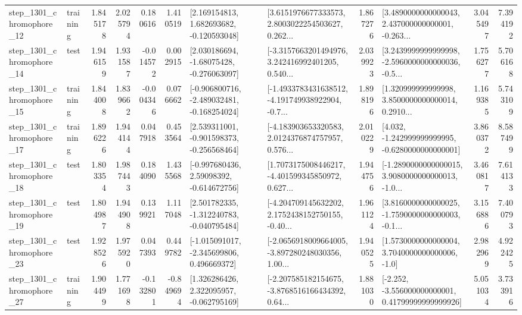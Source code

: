 \begin{tabular}{llrrrrllrlrr}
 step\_1301\_chromophore\_12 &  training &      1.845178 &    2.025794 &      0.180616 &  1.410519 &    [2.169154813, 1.682693682, -0.120593048] &  [3.6151976677333573, 2.8003022254503627, 0.262... &       1.867276 &  [3.4890000000000043, 2.437000000000001, -0.263... &            3.045497 &          7.394192 \\
 step\_1301\_chromophore\_14 &      test &      1.946159 &    1.931587 &     -0.014572 &  0.002915 &    [2.030186694, -1.68075428, -0.276063097] &  [-3.3157663201494976, 3.242416992401205, 0.540... &       2.039923 &  [3.2439999999999998, -2.5960000000000036, -0.5... &            1.756277 &          5.706168 \\
 step\_1301\_chromophore\_15 &  training &      1.844008 &    1.839662 &     -0.004346 &  0.076662 &  [-0.906800716, -2.489032481, -0.168254024] &  [-1.4933783431638512, -4.191749938922904, -0.7... &       1.898196 &  [1.320999999999998, 3.8500000000000014, 0.2910... &            1.169385 &          5.743109 \\
 step\_1301\_chromophore\_17 &  training &      1.896226 &    1.944144 &      0.047918 &  0.453564 &   [2.539311001, -0.901598373, -0.256568464] &  [-4.183903653320583, 2.0124376874757957, 0.576... &       2.010229 &   [4.032, -1.242999999999995, -0.6280000000000001] &            3.860372 &          8.587499 \\
 step\_1301\_chromophore\_18 &      test &      1.803354 &    1.987443 &      0.184090 &  1.435568 &    [-0.997680436, 2.59098392, -0.614672756] &  [1.7073175008446217, -4.401599345850972, 0.627... &       1.944756 &  [-1.2890000000000015, 3.9080000000000013, -1.0... &            3.460817 &          7.614133 \\
 step\_1301\_chromophore\_19 &      test &      1.804987 &    1.944908 &      0.139921 &  1.117048 &   [2.501782335, -1.312240783, -0.040795484] &  [-4.204709145632202, 2.1752438152750155, -0.40... &       1.961124 &  [3.8160000000000025, -1.7590000000000003, -0.1... &            3.156886 &          7.400793 \\
 step\_1301\_chromophore\_23 &      test &      1.928526 &    1.975920 &      0.047393 &  0.449782 &   [-1.015091017, -2.345699806, 0.496669372] &  [-2.0656918009664005, -3.897280248030356, 1.00... &       1.940525 &     [1.5730000000000004, 3.7040000000000006, -1.0] &            2.982969 &          4.922425 \\
 step\_1301\_chromophore\_27 &  training &      1.904499 &    1.771698 &     -0.132801 & -0.849694 &    [1.326286426, 2.322095957, -0.062795169] &  [-2.207585182154675, -3.8768516166434392, 0.64... &       1.881030 &  [-2.252, -3.556000000000001, 0.41799999999999926] &            5.051034 &          3.733916 \\

\end{tabular}
